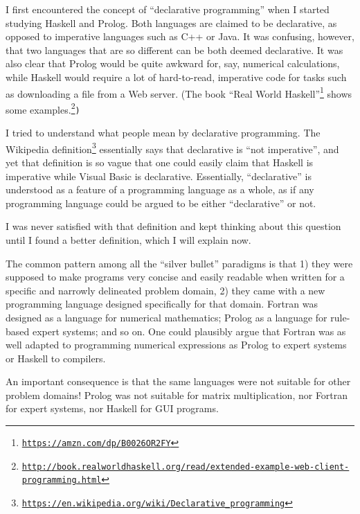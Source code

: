 I first encountered the concept of \textsf{``}declarative programming\textsf{''} when
I started studying Haskell and Prolog. Both languages are claimed
to be declarative, as opposed to imperative languages such as C++
or Java. It was confusing, however, that two languages that are so
different can be both deemed declarative. It was also clear that Prolog
would be quite awkward for, say, numerical calculations, while Haskell
would require a lot of hard-to-read, imperative code for tasks such
as downloading a file from a Web server. (The book \textsf{``}Real World Haskell\textsf{''}\footnote{\texttt{\href{https://amzn.com/dp/B0026OR2FY}{https://amzn.com/dp/B0026OR2FY}}}
shows some examples.\texttt{}\footnote{\texttt{\href{http://book.realworldhaskell.org/read/extended-example-web-client-programming.html}{http://book.realworldhaskell.org/read/extended-example-web-client-programming.html}}}\texttt{)}

I tried to understand what people mean by declarative programming.
The Wikipedia definition\footnote{\texttt{\href{https://en.wikipedia.org/wiki/Declarative_programming}{https://en.wikipedia.org/wiki/Declarative\_programming}}}
essentially says that declarative is \textsf{``}not imperative\textsf{''}, and yet
that definition is so vague that one could easily claim that Haskell
is imperative while Visual Basic is declarative. Essentially, \textsf{``}declarative\textsf{''}
is understood as a feature of a programming language as a whole, as
if any programming language could be argued to be either \textsf{``}declarative\textsf{''}
or not.

I was never satisfied with that definition and kept thinking about
this question until I found a better definition, which I will explain
now.

The common pattern among all the \textsf{``}silver bullet\textsf{''} paradigms is
that 1) they were supposed to make programs very concise and easily
readable when written for a specific and narrowly delineated problem
domain, 2) they came with a new programming language designed specifically
for that domain. Fortran was designed as a language for numerical
mathematics; Prolog as a language for rule-based expert systems; and
so on. One could plausibly argue that Fortran was as well adapted
to programming numerical expressions as Prolog to expert systems or
Haskell to compilers.

An important consequence is that the same languages were not suitable
for other problem domains! Prolog was not suitable for matrix multiplication,
nor Fortran for expert systems, nor Haskell for GUI programs.

